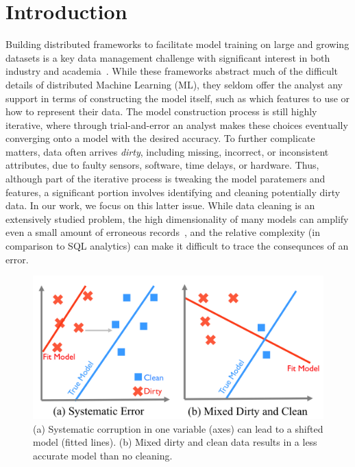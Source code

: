 \section{Introduction}
Building distributed frameworks to facilitate model training on large and growing datasets is a key data management challenge with significant interest in both industry and academia~\cite{bdas, alexandrov2014stratosphere, crotty2014tupleware, tensor}.
While these frameworks abstract much of the difficult details of distributed Machine Learning (ML), they seldom offer the analyst any support in terms of constructing the model itself, such as which features to use or how to represent their data.
The model construction process is still highly iterative, where through trial-and-error an analyst makes these choices eventually converging onto a model with the desired accuracy.
To further complicate matters, data often arrives \emph{dirty}, including missing, incorrect, or inconsistent attributes, due to faulty sensors, software, time delays, or hardware.
Thus, although part of the iterative process is tweaking the model paratemers and features, a significant portion involves identifying and cleaning potentially dirty data.  
In our work, we focus on this latter issue. 
While data cleaning is an extensively studied problem, the high dimensionality of many models can amplify even a small amount of erroneous records~\cite{xiaofeature}, and the relative complexity (in comparison to SQL analytics) can make it difficult to trace the consequnces of an error.

\begin{figure}[t]
\centering
 \includegraphics[width=\columnwidth]{figs/update-arch.png}
 \caption{(a) Systematic corruption in one variable (axes) can lead to a shifted model (fitted lines). 
 (b) Mixed dirty and clean data results in a less accurate model than no cleaning.\label{update-arch1}}\vspace{-1em}
\end{figure}

